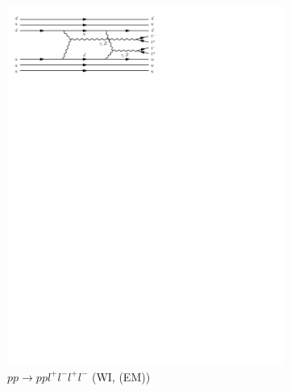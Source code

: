 \begin{figure}[h]
\begin{subfigure}[b]{0.3\textwidth}
    \includegraphics[trim={0.5cm 22cm 10cm 0cm},width=\textwidth]{../Diagrams/D8.pdf}
    \caption{$pp\rightarrow ppl^+l^-l^+l^-$ (WI, (EM))}
    \label{fey:8}
  \end{subfigure}%
  ~
  \begin{subfigure}[b]{0.3\textwidth}

\end{subfigure}
\end{figure}
